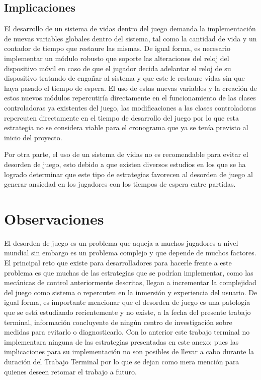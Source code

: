 \subsection{Implicaciones}
El desarrollo de un sistema de vidas dentro del juego demanda la implementación 
de nuevas variables globales dentro del sistema, tal como la cantidad de vida y 
un contador de tiempo que restaure las mismas. De igual forma, es necesario 
implementar un módulo robusto que soporte las alteraciones del reloj del 
dispositivo móvil en caso de que el jugador decida adelantar el reloj de su 
dispositivo tratando de engañar al sistema y que este le restaure vidas sin que 
haya pasado el tiempo de espera.  El uso de estas nuevas variables y la creación 
de estos nuevos módulos repercutiría directamente en el funcionamiento de las 
clases controladoras ya existentes del juego, las modificaciones a las clases 
controladoras repercuten directamente en el tiempo de desarrollo del juego por 
lo que esta estrategia no se considera viable para el cronograma que ya se tenía 
previsto al inicio del proyecto.
\\
\par
Por otra parte, el uso de un sistema de vidas no es recomendable para evitar el 
desorden de juego, esto debido a que existen diversos estudios en los que se ha 
logrado determinar que este tipo de estrategias favorecen al desorden de juego 
al generar ansiedad en los jugadores con los tiempos de espera entre partidas.

\section{Observaciones}
El desorden de juego es un problema que aqueja a muchos jugadores a nivel 
mundial sin embargo es un problema complejo y que depende de muchos factores. El 
principal reto que existe para desarrolladores para hacerle frente a este 
problema es que muchas de las estrategias que se podrían implementar, como las 
mecánicas de control anteriormente descritas, llegan a incrementar la 
complejidad del juego como sistema o repercuten en la inmersión y experiencia 
del usuario. De igual forma, es importante mencionar que el desorden de juego es 
una patología que se está estudiando recientemente y no existe, a la fecha del 
presente trabajo terminal, información concluyente de ningún centro de 
investigación sobre medidas para evitarlo o diagnosticarlo. Con lo anterior este 
trabajo terminal no implementara ninguna de las estrategias presentadas en este 
anexo; pues las implicaciones para su implementación no son posibles de llevar a 
cabo durante la duración del Trabajo Terminal por lo que se dejan como mera 
mención para quienes deseen retomar el trabajo a futuro.
